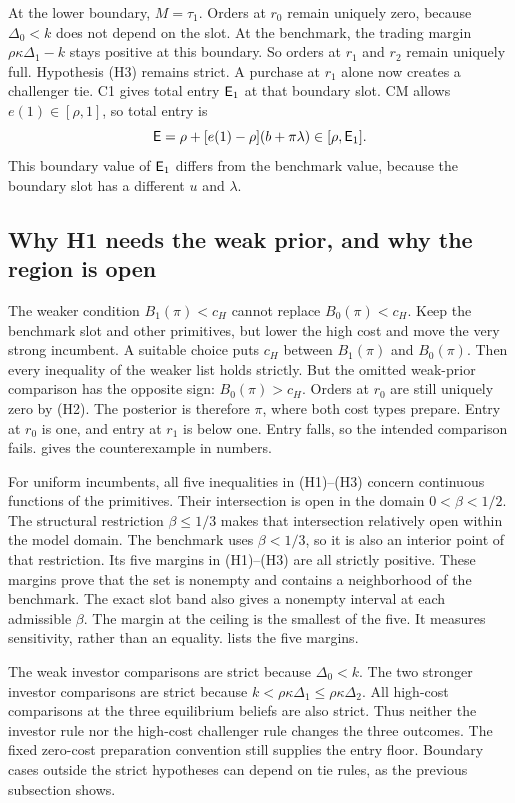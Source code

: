 At the lower boundary, $M=\tau_1$.
Orders at $r_0$ remain uniquely zero, because $\Delta_0<k$ does not depend on the slot.
At the benchmark, the trading margin $\rho\kappa\Delta_1-k$ stays positive at this boundary.
So orders at $r_1$ and $r_2$ remain uniquely full.
Hypothesis (H3) remains strict.
A purchase at $r_1$ alone now creates a challenger tie.
C1 gives total entry $\mathsf{E}_1$ at that boundary slot.
CM allows $e(1)\in[\rho,1]$, so total entry is
\[
\mathsf{E}=\rho+[e(1)-\rho](b+\pi\lambda)\in[\rho,\mathsf{E}_1].
\]
This boundary value of $\mathsf{E}_1$ differs from the benchmark value, because the boundary slot has a different $u$ and $\lambda$.

\subsection{Why H1 needs the weak prior, and why the region is open}
\label{sec:06_main_result-scope}

The weaker condition $B_1(\pi)<c_H$ cannot replace $B_0(\pi)<c_H$.
Keep the benchmark slot and other primitives, but lower the high cost and move the very strong incumbent.
A suitable choice puts $c_H$ between $B_1(\pi)$ and $B_0(\pi)$.
Then every inequality of the weaker list holds strictly.
But the omitted weak-prior comparison has the opposite sign: $B_0(\pi)>c_H$.
Orders at $r_0$ are still uniquely zero by (H2).
The posterior is therefore $\pi$, where both cost types prepare.
Entry at $r_0$ is one, and entry at $r_1$ is below one.
Entry falls, so the intended comparison fails. 
 gives the counterexample in numbers.

For uniform incumbents, all five inequalities in (H1)--(H3) concern continuous functions of the primitives.
Their intersection is open in the domain $0<\beta<1/2$.
The structural restriction $\beta\le1/3$ makes that intersection relatively open within the model domain.
The benchmark uses $\beta<1/3$, so it is also an interior point of that restriction.
Its five margins in (H1)--(H3) are all strictly positive.
These margins prove that the set is nonempty and contains a neighborhood of the benchmark.
The exact slot band also gives a nonempty interval at each admissible $\beta$.
The margin at the ceiling is the smallest of the five.
It measures sensitivity, rather than an equality.
 lists the five margins.

\begin{panelnote}
The weak investor comparisons are strict because $\Delta_0<k$.
The two stronger investor comparisons are strict because $k<\rho\kappa\Delta_1\le\rho\kappa\Delta_2$.
All high-cost comparisons at the three equilibrium beliefs are also strict.
Thus neither the investor rule nor the high-cost challenger rule changes the three outcomes.
The fixed zero-cost preparation convention still supplies the entry floor.
Boundary cases outside the strict hypotheses can depend on tie rules, as the previous subsection shows.
\end{panelnote}

